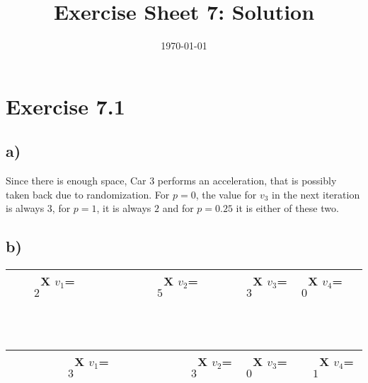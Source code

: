 \documentclass[a4paper]{article}
\begin{document}
\title{Exercise Sheet 7: Solution}
\author{}
\date{\today}

\section{Exercise 7.1}
\subsection{a)}
Since there is enough space, Car 3 performs an acceleration, that is possibly taken back due to randomization. For $p=0$, the value for $v_3$ in the next iteration is always $3$, for $p=1$, it is always $2$ and for $p=0.25$ it is either of these two.

\subsection{b)}
\begin{tabular}{|p{.4cm}|p{.4cm}|p{.4cm}|p{.4cm}|p{.4cm}|p{.4cm}|p{.4cm}|p{.4cm}|p{.4cm}|p{.4cm}|p{.4cm}|p{.4cm}|p{.4cm}|p{.4cm}|p{.4cm}|p{.4cm}|}
\hline
&&\ X \tiny$v_1$=$2$&&&&&&&\ X \tiny $v_2$=$5$&&&&\ X \tiny $v_3$=$3$&\ X \tiny $v_4$=$0$&\\
\hline
\end{tabular}\\
\\
\begin{tabular}{|p{.4cm}|p{.4cm}|p{.4cm}|p{.4cm}|p{.4cm}|p{.4cm}|p{.4cm}|p{.4cm}|p{.4cm}|p{.4cm}|p{.4cm}|p{.4cm}|p{.4cm}|p{.4cm}|p{.4cm}|p{.4cm}|}
\hline
&&&&&\ X \tiny$v_1$=$3$&&&&&&&\ X \tiny $v_2$=$3$&\ X \tiny $v_3$=$0$&&\ X \tiny $v_4$=$1$\\
\hline
\end{tabular} 
\end{document}
